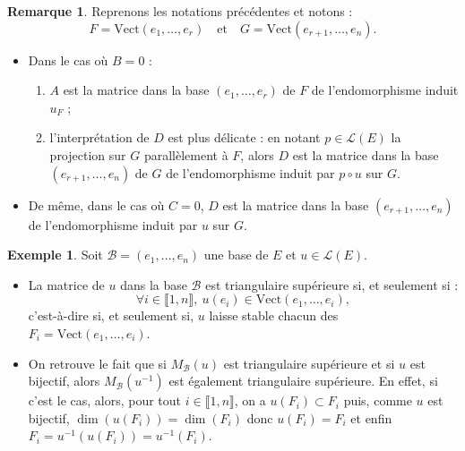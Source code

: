 \documentclass[french]{article}
\newcommand{\inv}{^{-1}}
\newcommand{\Vect}{\text{Vect}}
\theoremstyle{plain}
\theoremstyle{definition}
\newtheorem*{ex}{Exemple}
\newtheorem*{rmq}{Remarque}
\theoremstyle{remark}
\begin{document}
\begin{rmq}
	Reprenons les notations précédentes et notons :
	$$F=\Vect(e_1,\ldots,e_r)\quad\text{et}\quad G=\Vect(e_{r+1},\dots,e_n).$$
	\begin{itemize}
		\item Dans le cas où $B=0$ :
		\begin{enumerate}[label=$\star$]
			\item $A$ est la matrice dans la base $(e_1,\ldots,e_r)$ de $F$ de l'endomorphisme induit $u_F$ ;
			\item l'interprétation de $D$ est plus délicate : en notant $p\in\mathcal{L}(E)$ la projection sur $G$ parallèlement à $F$, alors $D$ est la matrice dans la base $(e_{r+1},\ldots,e_n)$ de $G$ de l'endomorphisme induit par $p\circ u$ sur $G$.
		\end{enumerate}
		\item De même, dans le cas où $C=0$, $D$ est la matrice dans la base $(e_{r+1},\ldots,e_n)$ de l'endomorphisme induit par $u$ sur $G$.
	\end{itemize}
\end{rmq}

\begin{ex}
	Soit $\mathcal{B}=(e_1,\ldots,e_n)$ une base de $E$ et $u\in\mathcal{L}(E)$.
	\begin{itemize}
		\item La matrice de $u$ dans la base $\mathcal{B}$ est triangulaire supérieure si, et seulement si :
		$$\forall i\in\llbracket1,n\rrbracket,\ u(e_i)\in\Vect(e_1,\ldots,e_i),$$ c'est-à-dire si, et seulement si, $u$ laisse stable chacun des $F_i=\Vect(e_1,\ldots,e_i)$.
		\item On retrouve le fait que si $M_\mathcal{B}(u)$ est triangulaire supérieure et si $u$ est bijectif, alors $M_\mathcal{B}(u\inv)$ est également triangulaire supérieure. En effet, si c'est le cas, alors, pour tout $i\in\llbracket1,n\rrbracket$, on a $u(F_i)\subset F_i$ puis, comme $u$ est bijectif, $\dim(u(F_i))=\dim(F_i)$ donc $u(F_i)=F_i$ et enfin $F_i=u\inv(u(F_i))=u\inv(F_i)$.
	\end{itemize}
\end{ex}
\end{document}

